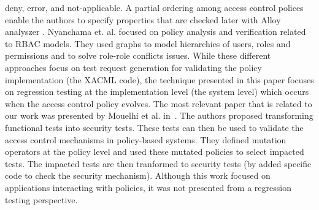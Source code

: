 deny, error, and not-applicable. A partial ordering among access control polices enable the authors to specify properties that are checked later
with Alloy analyszer \cite{Alloy}. Nyanchama et. al. \cite{Nyanchama99therole} focused on policy analysis and verification related to 
RBAC models. They used graphs to model hierarchies of users, roles and permissions and to solve role-role conflicts issues.
While these different approaches focus on test request generation for validating the policy implementation (the XACML code), 
the technique presented in this paper focuses on regression testing at the implementation level (the system level) which occurs when the access control policy evolves. 
 The most relevant paper that is related to our work was presented by Mouelhi et al. in~\cite{mouelhi09:tranforming}. The authors proposed transforming functional tests into security tests. 
These tests can then be used to validate the access control mechanisms in policy-based systems. They defined mutation operators at the policy level and used these mutated policies to select impacted tests. The impacted tests are then tranformed to security tests (by added specific code to check the security mechanism). 
Although this work focused on applications interacting with policies, it was not presented from a regression testing perspective. 



